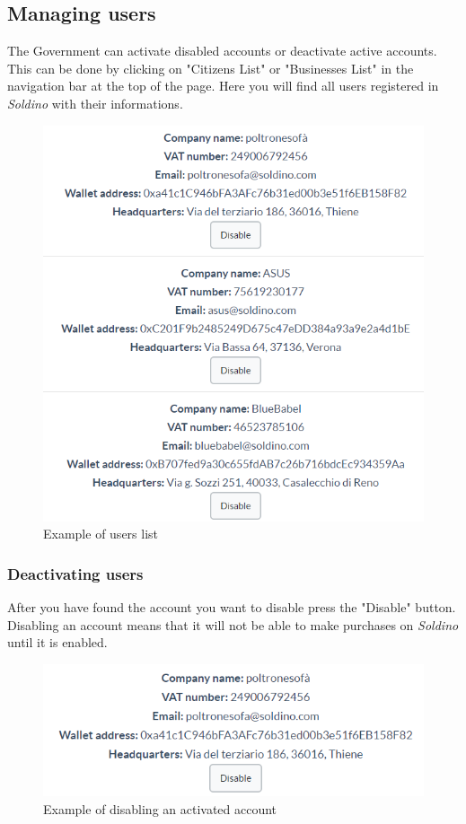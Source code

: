	\subsection{Managing users}
	The Government can activate disabled accounts or deactivate active accounts.
	This can be done by clicking on "Citizens List" or "Businesses List" in the 
	navigation bar at the top of the page. Here you will find all users 
	registered in \textit{Soldino} with their informations.
	\begin{figure}[H]
		\includegraphics[width=13cm]{res/images/users_list.png}
		\centering
		\caption{Example of users list}
	\end{figure}
		\subsubsection{Deactivating users}
		After you have found the account you want to disable press the 
		"Disable" button. Disabling an account means that it will not be able 
		to make purchases on \textit{Soldino} 
		until it is enabled.
		\begin{figure}[H]
			\includegraphics[width=15cm]{res/images/user_disable.png}
			\centering
			\caption{Example of disabling an activated account}
		\end{figure}
